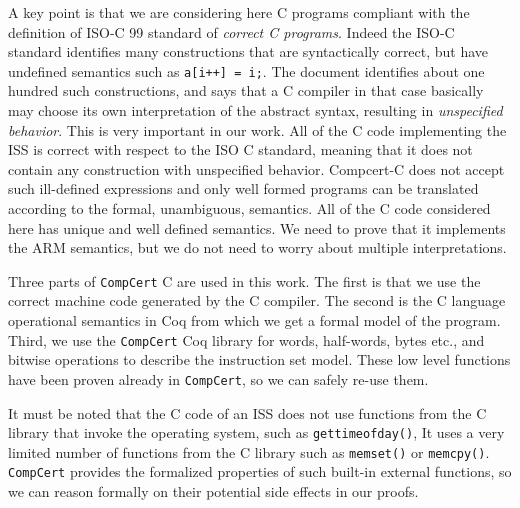 \documentclass{llncs}
\newcommand{\compcert}{\texttt{CompCert}\xspace}
\begin{document}
A key point is that we are considering here C programs compliant with
the definition of ISO-C 99 standard of {\em correct C programs}.
Indeed the ISO-C standard identifies many constructions that are
syntactically correct, but have undefined semantics such as
\texttt{a[i++] = i;}. The document identifies about one hundred
such constructions, and says that a C compiler in that case basically
may choose its own interpretation of the abstract syntax,
resulting in \textit{unspecified behavior}.
This is very important in our work. All of the C code implementing the
ISS is correct with respect to the ISO C standard, meaning that it does
not contain any construction with unspecified behavior. Compcert-C
does not accept such ill-defined expressions and only well formed
programs can be translated according to the formal, unambiguous,
semantics. All of the C code considered here has unique and
well defined semantics. We need to prove that it implements the ARM
semantics, but we do not need to worry about multiple interpretations.

Three parts of \compcert C are used in this work. The first is that we
use the correct machine code generated by the C compiler.  The second
is the C language operational semantics in Coq
from which we get a formal model of the program.
Third, we use the \compcert Coq library for words,
half-words, bytes etc., and bitwise operations
to describe the instruction set model. These low level functions have
been proven already in \compcert, so we can safely re-use them.

It must be noted that the C code of an ISS does not use functions from
the C library that invoke the operating system, such as
\texttt{gettimeofday()},
It uses a very limited number of
functions from the C library such as \texttt{memset()} or
\texttt{memcpy()}.  \compcert provides the formalized properties of
such built-in external functions, so we can reason formally on their
potential side effects in our proofs.


\end{document}

